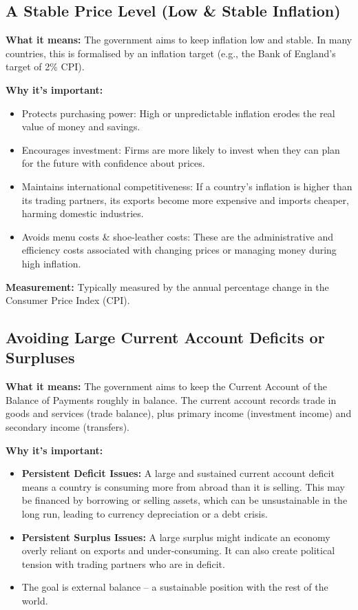 \documentclass[11pt, a4paper, twoside]{book}
\begin{document}
\subsection{A Stable Price Level (Low \& Stable Inflation)}

\textbf{What it means:} The government aims to keep inflation low and stable. In many countries, this is formalised by an inflation target (e.g., the Bank of England's target of 2\% CPI).

\textbf{Why it's important:}
\begin{itemize}
  \item Protects purchasing power: High or unpredictable inflation erodes the real value of money and savings.
  \item Encourages investment: Firms are more likely to invest when they can plan for the future with confidence about prices.
  \item Maintains international competitiveness: If a country's inflation is higher than its trading partners, its exports become more expensive and imports cheaper, harming domestic industries.
  \item Avoids menu costs \& shoe-leather costs: These are the administrative and efficiency costs associated with changing prices or managing money during high inflation.
\end{itemize}

\textbf{Measurement:} Typically measured by the annual percentage change in the Consumer Price Index (CPI).

\subsection{Avoiding Large Current Account Deficits or Surpluses}

\textbf{What it means:} The government aims to keep the Current Account of the Balance of Payments roughly in balance. The current account records trade in goods and services (trade balance), plus primary income (investment income) and secondary income (transfers).

\textbf{Why it's important:}
\begin{itemize}
  \item \textbf{Persistent Deficit Issues:} A large and sustained current account deficit means a country is consuming more from abroad than it is selling. This may be financed by borrowing or selling assets, which can be unsustainable in the long run, leading to currency depreciation or a debt crisis.
  \item \textbf{Persistent Surplus Issues:} A large surplus might indicate an economy overly reliant on exports and under-consuming. It can also create political tension with trading partners who are in deficit.
  \item The goal is external balance -- a sustainable position with the rest of the world.
\end{itemize}
\end{document}
